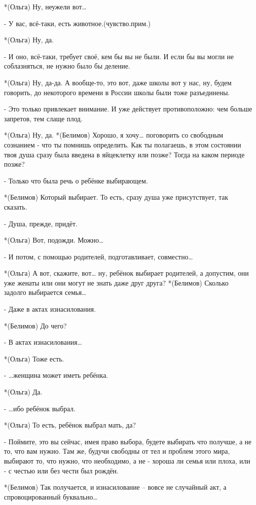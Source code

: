 *(Ольга) Ну, неужели вот…

- У вас, всё-таки, есть животное.(чувство.прим.)

*(Ольга) Ну, да.

- И оно, всё-таки, требует своё, кем бы вы не были. И если бы вы могли не соблазняться, не нужно было бы деление.

*(Ольга) Ну, да-да. А вообще-то, это вот, даже школы вот у нас, ну, будем говорить, до некоторого времени в России школы были тоже разъединены.

- Это только привлекает внимание. И уже действует противоположно: чем больше запретов, тем слаще плод.

*(Ольга) Ну, да.
*(Белимов) Хорошо, я хочу… поговорить со свободным сознанием - что ты помнишь определить. Как ты полагаешь, в этом состоянии твоя душа сразу была введена в яйцеклетку или позже? Тогда на каком периоде позже?

- Только что была речь о ребёнке выбирающем.

*(Белимов) Который выбирает. То есть, сразу душа уже присутствует, так сказать.

- Душа, прежде, придёт.

*(Ольга) Вот, подожди. Можно…

- И потом, с помощью родителей, подготавливает, совместно…

*(Ольга) А вот, скажите, вот… ну, ребёнок выбирает родителей, а допустим, они уже женаты или они могут не знать даже друг друга?
*(Белимов) Сколько задолго выбирается семья…

- Даже в актах изнасилования.

*(Белимов) До чего?

- В актах изнасилования…

*(Ольга) Тоже есть.

- …женщина может иметь ребёнка.

*(Ольга) Да.

- …ибо ребёнок выбрал.

*(Ольга) То есть, ребёнок выбрал мать, да?

- Поймите, это вы сейчас, имея право выбора, будете выбирать что получше, а не то, что вам нужно. Там же, будучи свободны от тел и проблем этого мира, выбирают то, что нужно, что необходимо, а не - хороша ли семья или плоха, или - с честью или без чести был рождён.

*(Белимов) Так получается, и изнасилование – вовсе не случайный акт, а спровоцированный буквально…

